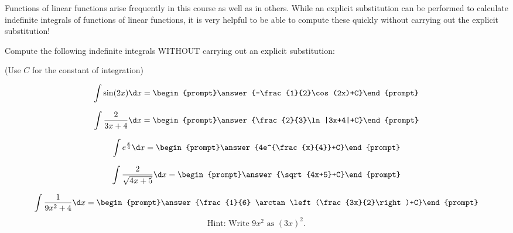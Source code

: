 \documentclass{ximera}
\author{Jim Talamo}
\begin{document}
\begin{exercise}

Functions of linear functions arise frequently in this course as well as in others.  While an explicit substitution can be performed to calculate indefinite integrals of functions of linear functions, it is very helpful to be able to compute these quickly without carrying out the explicit substitution!  

Compute the following indefinite integrals WITHOUT carrying out an explicit substitution:

\begin{prompt} (Use $C$ for the constant of integration) \end{prompt}

\[\int \sin(2x) \d x = \begin{prompt}\answer{-\frac{1}{2}\cos(2x)+C}\end{prompt}\]

\[\int \frac{2}{3x+4} \d x = \begin{prompt}\answer{\frac{2}{3}\ln|3x+4|+C}\end{prompt}\]

\[\int e^{\frac{x}{4}} \d x = \begin{prompt}\answer{4e^{\frac{x}{4}}+C}\end{prompt}\]

\[\int \frac{2}{\sqrt{4x+5}} \d x = \begin{prompt}\answer{\sqrt{4x+5}+C}\end{prompt}\]

\[\int \frac{1}{9x^2+4} \d x = \begin{prompt}\answer{\frac{1}{6} \arctan\left(\frac{3x}{2}\right)+C}\end{prompt}\]
\[\mbox{Hint: Write $9x^2$ as $(3x)^2$.}\]





\end{exercise}
\end{document}

